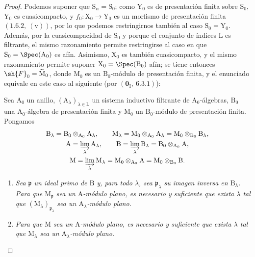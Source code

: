 \begin{proof}
Podemos suponer que $\mathrm{S}_\alpha=\mathrm{S}_0$; como $\mathrm{Y}_0$ es de presentación finita sobre $\mathrm{S}_0$, $\mathrm{Y}_0$ es cuasicompacto, y $f_0:\mathrm{X}_0\to\mathrm{Y}_0$ es un morfismo de presentación finita $(1.6.2,~(\mathrm{v}))$, por lo que podemos restringirnos también al caso $\mathrm{S}_0=\mathrm{Y}_0$. Además, por la cuasicompacidad de $\mathrm{S}_0$ y porque el conjunto de índices $\mathrm{L}$ es filtrante, el mismo razonamiento permite restringirse al caso en que $\mathrm{S}_0=\Spec(\mathrm{A}_0)$ es afín. Asimismo, $\mathrm{X}_0$ es también cuasicompacto, y el mismo razonamiento permite suponer $\mathrm{X}_0=\Spec(\mathrm{B}_0)$ afín; se tiene entonces $\sh{F}_0=\widetilde{\mathrm{M}}_0$, donde $\mathrm{M}_0$ es un $\mathrm{B}_0$-módulo de presentación finita, y el enunciado  equivale en este caso al siguiente (por $(\mathbf{0}_\mathrm{I},~6.3.1)$):

\begin{corollary}[11.2.6.1]
\label{IV.11.2.6.1}
Sea $\mathrm{A}_0$ un anillo,
$(\mathrm{A}_\lambda)_{\lambda\in\mathrm{L}}$ un sistema inductivo
filtrante de $\mathrm{A}_0$-álgebras, $\mathrm{B}_0$ una
$\mathrm{A}_0$-álgebra de presentación finita y $\mathrm{M}_0$ un
$\mathrm{B}_0$-módulo de presentación finita. Pongamos
\[
\begin{gathered}
  \mathrm{B}_\lambda
    =\mathrm{B}_0\otimes_{\mathrm{A}_0}\mathrm{A}_\lambda,\qquad
  \mathrm{M}_\lambda
    =\mathrm{M}_0\otimes_{\mathrm{A}_0}\mathrm{A}_\lambda
    =\mathrm{M}_0\otimes_{\mathrm{B}_0}\mathrm{B}_\lambda,\\
  \mathrm{A}=\varinjlim_\lambda\mathrm{A}_\lambda,\qquad
  \mathrm{B}=\varinjlim_\lambda\mathrm{B}_\lambda
    =\mathrm{B}_0\otimes_{\mathrm{A}_0}\mathrm{A},\\
  \mathrm{M}=\varinjlim_\lambda\mathrm{M}_\lambda
    =\mathrm{M}_0\otimes_{\mathrm{A}_0}\mathrm{A}
    =\mathrm{M}_0\otimes_{\mathrm{B}_0}\mathrm{B}.
\end{gathered}
\]
\begin{enumerate}[label=\emph{(\roman*)}]
  \item \emph{Sea $\mathfrak{p}$ un ideal primo de $\mathrm{B}$ y, para todo $\lambda$, sea $\mathfrak{p}_\lambda$ su imagen inversa en $\mathrm{B}_\lambda$. Para que $\mathrm{M}_\mathfrak{p}$ sea un $\mathrm{A}$-módulo plano, es necesario y suficiente que exista $\lambda$ tal que $(\mathrm{M}_\lambda)_{\mathfrak{p}_\lambda}$ sea un $\mathrm{A}_\lambda$-módulo plano.}
  \item \emph{Para que $\mathrm{M}$ sea un $\mathrm{A}$-módulo plano, es necesario y suficiente que exista $\lambda$ tal que $\mathrm{M}_\lambda$ sea un $\mathrm{A}_\lambda$-módulo plano.}
\end{enumerate}
\end{corollary}


\end{proof}
